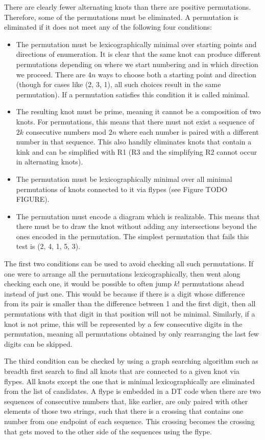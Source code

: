 \begin{paper}
There are clearly fewer alternating knots than there are positive permutations.
Therefore, some of the permutations must be eliminated.
A permutation is eliminated if it does not meet any of the following four
conditions:
\begin{itemize}
\item The permutation must be lexicographically minimal over starting points and
directions of enumeration.
It is clear that the same knot can produce different permutations depending on
where we start numbering and in which direction we proceed.
There are $4n$ ways to choose both a starting point and direction (though for
cases like (2, 3, 1), all such choices result in the same permutation).
If a permutation satisfies this condition it is called minimal.
\item The resulting knot must be prime, meaning it cannot be a composition of
two knots.
For permutations, this means that there must not exist a sequence of $2k$
consecutive numbers mod $2n$ where each number is paired with a different number
in that sequence.
This also handily eliminates knots that contain a kink and can be simplified
with R1 (R3 and the simplifying R2 cannot occur in alternating knots).
\item The permutation must be lexicographically minimal over all minimal
permutations of knots connected to it via flypes (see Figure TODO FIGURE).
\item The permutation must encode a diagram which is realizable.
This means that there must be to draw the knot without adding any intersections
beyond the ones encoded in the permutation.
The simplest permutation that fails this test is (2, 4, 1, 5, 3).
\end{itemize}

The first two conditions can be used to avoid checking all such permutations.
If one were to arrange all the permutations lexicographically, then went along
checking each one, it would be possible to often jump $k!$ permutations ahead
instead of just one.
This would be because if there is a digit whose difference from its pair is
smaller than the difference between 1 and the first digit, then all permutations
with that digit in that position will not be minimal.
Similarly, if a knot is not prime, this will be represented by a few consecutive
digits in the permutation, meaning all permutations obtained by only rearranging
the last few digits can be skipped.

The third condition can be checked by using a graph searching algorithm such as
breadth first search to find all knots that are connected to a given knot via
flypes.
All knots except the one that is minimal lexicographically are eliminated from
the list of candidates.
A flype is embedded in a DT code when there are two sequences of consecutive
numbers that, like earlier, are only paired with other elements of those two
strings, such that there is a crossing that contains one number from one
endpoint of each sequence.
This crossing becomes the crossing that gets moved to the other side of the
sequences using the flype.


\end{paper}
